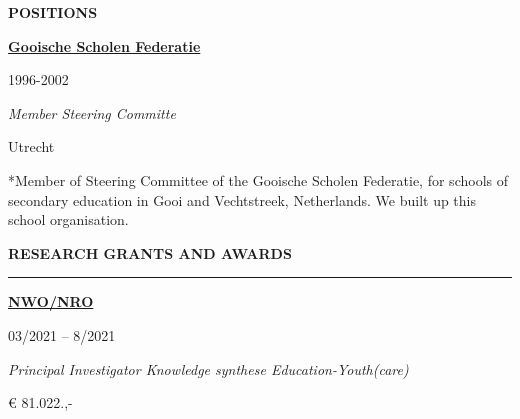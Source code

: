 \documentclass[
  16,
]{article}
\begin{document}
\begin{large}{\bf POSITIONS}
\begin{large}
  \begin{multicols}{2}
    \begin{flushleft}{\bf \href{https://gsf.nl/}{Gooische Scholen Federatie}}\end{flushleft}
    \begin{flushright}1996-2002\end{flushright}
  \end{multicols}
  \vspace{-0.17cm}
  \begin{multicols}{2}
    \begin{flushleft}\textit{Member Steering Committe}\end{flushleft}
    \begin{flushright}Utrecht\end{flushright}\end
  {multicols}
\end{large}
\vspace{-0.16cm}

*Member of Steering Committee of the Gooische Scholen Federatie, for
schools of secondary education in Gooi and Vechtstreek, Netherlands. We
built up this school organisation.

\vspace{7pt}

\begin{large}{\bf RESEARCH GRANTS AND AWARDS}
  \vspace{3pt}
  \hrule
  \begin{multicols}{2}
    \begin{flushleft}{\bf \href{https://www.nro.nl/}{NWO/NRO}}\end{flushleft}
    \begin{flushright}03/2021 – 8/2021\end{flushright}
  \end{multicols}
  \vspace{-0.17cm}
  \begin{multicols}{2}
    \begin{flushleft}\textit{Principal Investigator Knowledge synthese Education-Youth(care)}\end
    {flushleft}\begin{flushright}€ 81.022.,- \end
    {flushright}
  \end{multicols}


\vspace{7pt}



\end{large}
\end{large}
\end{document}
